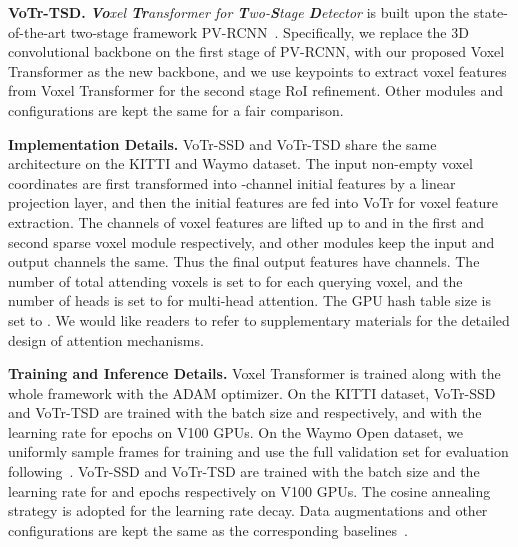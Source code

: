 \documentclass[10pt,twocolumn,letterpaper]{article}
\begin{document}
\noindent\textbf{VoTr-TSD.} \textit{\textbf{Vo}xel \textbf{Tr}ansformer for \textbf{T}wo-\textbf{S}tage \textbf{D}etector} is built upon the state-of-the-art two-stage framework PV-RCNN~\cite{shi2020pv}. Specifically, we replace the 3D convolutional backbone on the first stage of PV-RCNN, with our proposed Voxel Transformer as the new backbone, and we use keypoints to extract voxel features from Voxel Transformer for the second stage RoI refinement. Other modules and configurations are kept the same for a fair comparison.

\noindent\textbf{Implementation Details.} VoTr-SSD and VoTr-TSD share the same architecture on the KITTI and Waymo dataset. The input non-empty voxel coordinates are first transformed into -channel initial features by a linear projection layer, and then the initial features are fed into VoTr for voxel feature extraction. The channels of voxel features are lifted up to  and  in the first and second sparse voxel module respectively, and other modules keep the input and output channels the same. Thus the final output features have  channels. The number of total attending voxels is set to  for each querying voxel, and the number of heads is set to  for multi-head attention. The GPU hash table size  is set to . We would like readers to refer to supplementary materials for the detailed design of attention mechanisms.

\noindent\textbf{Training and Inference Details.} Voxel Transformer is trained along with the whole framework with the ADAM optimizer. On the KITTI dataset, VoTr-SSD and VoTr-TSD are trained with the batch size  and  respectively, and with the learning rate  for  epochs on  V100 GPUs. On the Waymo Open dataset, we uniformly sample  frames for training and use the full validation set for evaluation following~\cite{shi2020pv}. VoTr-SSD and VoTr-TSD are trained with the batch size  and the learning rate  for  and  epochs respectively on  V100 GPUs. The cosine annealing strategy is adopted for the learning rate decay. Data augmentations and other configurations are kept the same as the corresponding baselines~\cite{yan2018second, shi2020pv}.
\end{document}
